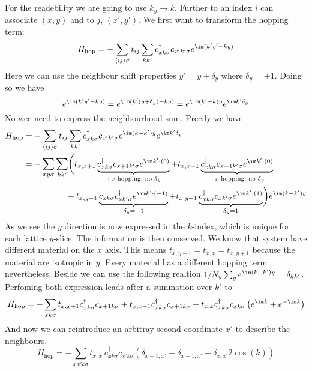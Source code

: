 \documentclass[../main.tex]{subfile}
\begin{document}
For the readebility we are going to use $k_y \rightarrow k$.
Further to an index $i$  can associate $(x,y)$ and to $j$, $(x',y')$.
We first want to transform the hopping term:
\begin{equation*}
    H_{\text{hop}} = -\sum_{\langle ij\rangle \sigma} t_{ij} \sum_{kk'} c^{\dagger}_{x k\sigma} c_{x' k'\sigma} e^{\im (k' y' - k y)}
\end{equation*}
Here we can use the neighbour shift properties $y' = y + \delta_y$ where $\delta_y = \pm 1$. Doing so we have 
\[
    e^{\im (k' y' - k y)} = e^{\im (k' (y+\delta_y) -  k y)} = e^{\im (k' -  k)y}e^{\im k'\delta_y}
\]
No wee need to express the neighbourhood sum. Precily we have
\begin{align*}
        H_{\text{hop}} =& -\sum_{\langle ij\rangle \sigma} t_{ij} \sum_{kk'} c^{\dagger}_{x k\sigma} c_{x' k'\sigma}  e^{\im (k -  k')y}e^{\im k'\delta_y}\\
                        =& -\sum_{xy \sigma} \sum_{kk'}  \biggl( t_{x,x+1} \underbrace{c_{x k\sigma}^{\dagger} c_{x+1 k'\sigma}e^{\im k'\cdot (0)}}_{\text{$+x$ hopping, no $\delta_y$}} +  t_{x,x-1} \underbrace{c_{x k\sigma}^{\dagger} c_{x-1 k'\sigma} e^{\im k'\cdot (0)}}_{\text{$-x$ hopping, no $\delta_y$}}\\
                        & ~~~~~~~~~~~~+t_{x,y-1} \underbrace{c_{x k\sigma} c_{x k'\sigma}^{\dagger} e^{\im k'\cdot (-1)}}_{\delta_y = -1} + t_{x,y+1} \underbrace{c_{x k\sigma}^{\dagger} c_{x k'\sigma}e^{\im k'\cdot (1)}}_{\delta_y = 1}\biggr)e^{\im (k -  k')y}
\end{align*}
As we see the $y$ direction is now expressed in the $k$-index, which is unique for each lattice $y$-slice. The information is then conserved. 
We know that system have different material on the $x$ axis. This means $t_{x,y-1} = t_{x,x} = t_{x,y+1}$ because the material are isotropic in $y$. Every material has a 
different hopping term nevertheless. Beside we can use the following realtion $1/N_y \sum_{y} e^{\im (k -  k')y} = \delta_{kk'}$. Perfoming both expression leads after a summation over $k'$ to
\begin{equation*}
    H_{\text{hop}} = -\sum_{x k \sigma} t_{x,x+1} c_{x k\sigma}^{\dagger} c_{x+1 k\sigma} + t_{x,x-1} c_{x k\sigma}^{\dagger} c_{x+1 k\sigma} +  t_{x,x} c_{x k\sigma}^{\dagger} c_{xk\sigma}\left(e^{\im k} + e^{-\im k}\right)
\end{equation*}
And now we can reintroduce an arbitray second coordinate $x'$ to describe the neighbours.
\begin{equation}
    H_{\text{hop}} = -\sum_{xx' k \sigma} t_{x,x'} c_{x k\sigma}^{\dagger} c_{x' k\sigma} \left(\delta_{x+1,x'} + \delta_{x-1,x'} + \delta_{x,x'} 2 \cos(k)\right)
\end{equation}
\end{document}
